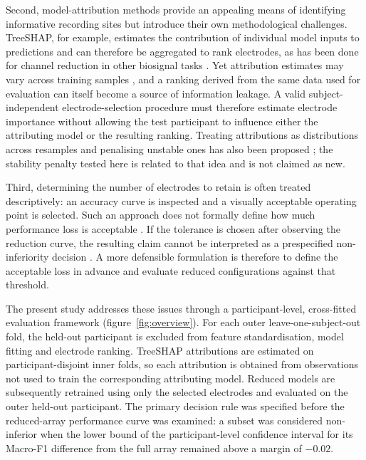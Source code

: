 Second, model-attribution methods provide an appealing means of identifying informative recording sites but introduce their own methodological challenges. TreeSHAP, for example, estimates the contribution of individual model inputs to predictions \citep{lundberg2017unified,lundberg2020local} and can therefore be aggregated to rank electrodes, as has been done for channel reduction in other biosignal tasks \citep{salmi2025shapaad}. Yet attribution estimates may vary across training samples \citep{visani2022statistical,kelodjou2023shaping}, and a ranking derived from the same data used for evaluation can itself become a source of information leakage. A valid subject-independent electrode-selection procedure must therefore estimate electrode importance without allowing the test participant to influence either the attributing model or the resulting ranking. Treating attributions as distributions across resamples and penalising unstable ones has also been proposed \citep{xiang2026roshap,meinshausen2010stability}; the stability penalty tested here is related to that idea and is not claimed as new.

Third, determining the number of electrodes to retain is often treated descriptively: an accuracy curve is inspected and a visually acceptable operating point is selected. Such an approach does not formally define how much performance loss is acceptable \citep{schuirmann1987comparison,walker2011understanding}. If the tolerance is chosen after observing the reduction curve, the resulting claim cannot be interpreted as a prespecified non-inferiority decision \citep{campbell2018noninferiority}. A more defensible formulation is therefore to define the acceptable loss in advance and evaluate reduced configurations against that threshold.

The present study addresses these issues through a participant-level, cross-fitted evaluation framework (figure~\ref{fig:overview}). For each outer leave-one-subject-out fold, the held-out participant is excluded from feature standardisation, model fitting and electrode ranking. TreeSHAP attributions are estimated on participant-disjoint inner folds, so each attribution is obtained from observations not used to train the corresponding attributing model. Reduced models are subsequently retrained using only the selected electrodes and evaluated on the outer held-out participant. The primary decision rule was specified before the reduced-array performance curve was examined: a subset was considered non-inferior when the lower bound of the participant-level confidence interval for its Macro-F1 difference from the full array remained above a margin of $-0.02$.

